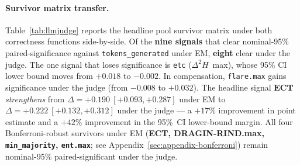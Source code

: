 \documentclass[11pt]{article}
\begin{document}
\paragraph{Survivor matrix transfer.}
Table~\ref{tab:llmjudge} reports the headline pool survivor matrix under
both correctness functions side-by-side. Of the \textbf{nine signals} that
clear nominal-95\% paired-significance against \texttt{tokens\_generated}
under EM, \textbf{eight} clear under the judge. The one signal that loses
significance is \texttt{etc} ($\Delta^2 H$~max), whose 95\% CI lower bound moves
from $+0.018$ to $-0.002$. In compensation, \texttt{flare.max} gains
significance under the judge (from $-0.008$ to $+0.032$). The headline
signal $\textbf{ECT}$ \emph{strengthens} from
$\Delta{=}+0.190~[+0.093, +0.287]$ under EM to
$\Delta{=}+0.222~[+0.132, +0.312]$ under the judge — a $+17\%$
improvement in point estimate and a $+42\%$ improvement in the 95\%~CI
lower-bound margin. All four Bonferroni-robust survivors under EM
(\textbf{ECT, DRAGIN-RIND.max, \texttt{min\_majority}, \texttt{ent.max}};
see Appendix~\ref{sec:appendix-bonferroni}) remain nominal-95\%
paired-significant under the judge.
\end{document}
